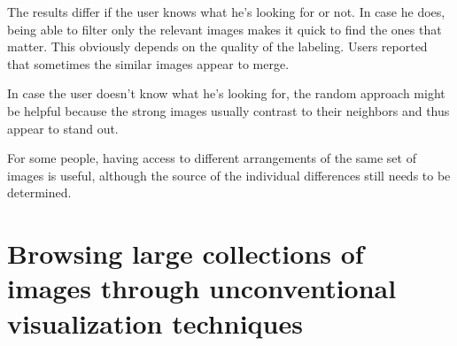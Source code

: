The results differ if the user knows what he's looking for or not. In case he does, being able to filter only the relevant images makes it quick to find the ones that matter. This obviously depends on the quality of the labeling. Users reported that sometimes the similar images appear to merge.

In case the user doesn't know what he's looking for, the random approach might be helpful because the strong images usually contrast to their neighbors and thus appear to stand out.

For some people, having access to different arrangements of the same set of images is useful, although the source of the individual differences still needs to be determined.



\section{Browsing large collections of images through unconventional visualization techniques} %
\label{sub:Porta}

